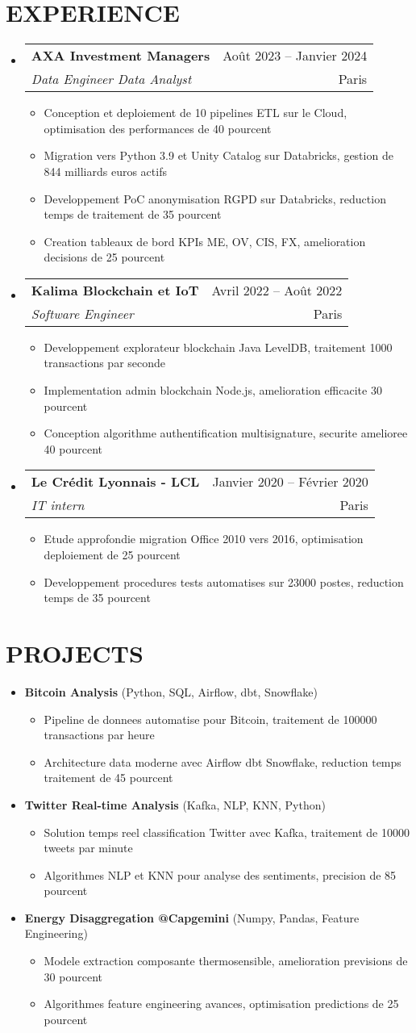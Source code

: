 \documentclass[letterpaper,11pt]{article}
\makeatletter
\newcommand{\resumeItem}[1]{
  \item\small{
    {#1 \vspace{-1pt}}
  }
}
\newcommand{\resumeSubheading}[4]{
  \vspace{-1pt}\item
    \begin{tabular*}{\textwidth}[t]{l@{\extracolsep{\fill}}r}
      \textbf{#1} & {\color{dark-grey}\small #2}\vspace{1pt}\\
      \textit{#3} & {\color{dark-grey} \small #4}\\
    \end{tabular*}\vspace{-4pt}
}
\newcommand{\resumeProjectHeading}[2]{
  \item
  {#1} \hfill {#2}
}
\newcommand{\resumeSubHeadingListStart}{\begin{itemize}[leftmargin=0in, label={}]}
\newcommand{\resumeSubHeadingListEnd}{\end{itemize}}
\newcommand{\resumeItemListStart}{\begin{itemize}[label={\textbullet}]}
\newcommand{\resumeItemListEnd}{\end{itemize}\vspace{0pt}}
\makeatother
\begin{document}
\section{EXPERIENCE}
\resumeSubHeadingListStart
    \resumeSubheading
      {AXA Investment Managers}{Ao\^{u}t 2023 -- Janvier 2024}
      {Data Engineer   Data Analyst}{Paris}
      \resumeItemListStart
        \resumeItem{Conception et deploiement de 10 pipelines ETL sur le Cloud, optimisation des performances de 40 pourcent}
        \resumeItem{Migration vers Python 3.9 et Unity Catalog sur Databricks, gestion de 844 milliards euros actifs}
        \resumeItem{Developpement PoC anonymisation RGPD sur Databricks, reduction temps de traitement de 35 pourcent}
        \resumeItem{Creation tableaux de bord KPIs ME, OV, CIS, FX, amelioration decisions de 25 pourcent}
      \resumeItemListEnd
    \resumeSubheading
      {Kalima Blockchain et IoT}{Avril 2022 -- Ao\^{u}t 2022}
      {Software Engineer}{Paris}
      \resumeItemListStart
        \resumeItem{Developpement explorateur blockchain Java LevelDB, traitement 1000 transactions par seconde}
        \resumeItem{Implementation admin blockchain Node.js, amelioration efficacite 30 pourcent}
        \resumeItem{Conception algorithme authentification multisignature, securite amelioree 40 pourcent}
      \resumeItemListEnd
    \resumeSubheading
      {Le Cr\'{e}dit Lyonnais - LCL}{Janvier 2020 -- F\'{e}vrier 2020}
      {IT intern}{Paris}
      \resumeItemListStart
        \resumeItem{Etude approfondie migration Office 2010 vers 2016, optimisation deploiement de 25 pourcent}
        \resumeItem{Developpement procedures tests automatises sur 23000 postes, reduction temps de 35 pourcent}
      \resumeItemListEnd
  \resumeSubHeadingListEnd

\section{PROJECTS}
\resumeSubHeadingListStart
      \resumeProjectHeading
          {\textbf{Bitcoin Analysis} \small{(Python, SQL, Airflow, dbt, Snowflake)}} {}
          \resumeItemListStart
            \resumeItem{Pipeline de donnees automatise pour Bitcoin, traitement de 100000 transactions par heure}
            \resumeItem{Architecture data moderne avec Airflow dbt Snowflake, reduction temps traitement de 45 pourcent}
          \resumeItemListEnd
      \resumeProjectHeading
          {\textbf{Twitter Real-time Analysis} \small{(Kafka, NLP, KNN, Python)}} {}
          \resumeItemListStart
            \resumeItem{Solution temps reel classification Twitter avec Kafka, traitement de 10000 tweets par minute}
            \resumeItem{Algorithmes NLP et KNN pour analyse des sentiments, precision de 85 pourcent}
          \resumeItemListEnd
      \resumeProjectHeading
          {\textbf{Energy Disaggregation @Capgemini} \small{(Numpy, Pandas, Feature Engineering)}} {}
          \resumeItemListStart
            \resumeItem{Modele extraction composante thermosensible, amelioration previsions de 30 pourcent}
            \resumeItem{Algorithmes feature engineering avances, optimisation predictions de 25 pourcent}
          \resumeItemListEnd
    \resumeSubHeadingListEnd
\end{document}
